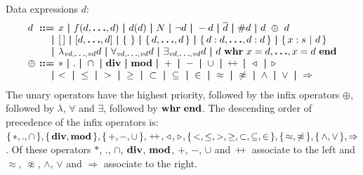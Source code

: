 \documentclass[a4paper,fleqn]{article}
\makeatletter
\newenvironment{tightarray}[1]
  {\setlength{\arraycolsep}{2pt}%
   \begin{array}{@{}#1@{}}%
  }
  {\end{array}%
  }
\newcommand{\f}[1]{\ensuremath{\mathit{#1}}}
\newcommand{\set}[1]{\ensuremath{\{\,#1\,\}}}
\newcommand{\scompr}[2]{\ensuremath{\set{#1\ |\ #2}}}
\newcommand{\el}{\ensuremath{[\,]}}
\newcommand{\cons}{\ensuremath{\hspace{0.12em}\triangleright\hspace{0.08em}}}
\newcommand{\snoc}{\ensuremath{\hspace{0.08em}\triangleleft\hspace{0.12em}}}
\newcommand{\concat}{\ensuremath{\hspace{0.12em}\raisebox{0.2ex}
{\text{\footnotesize+}\!\text{\footnotesize+}}\hspace{0.12em}}}
\newcommand{\limp}{\ensuremath{\Rightarrow}}
\newcommand{\mb}[1]{\text{\boldmath$#1$}}%
\newlength{\tlength}
\newcommand{\kwwhr}{{\bf whr}}
\newcommand{\kwend}{{\bf end}}
\newcommand{\kwdiv}{{\bf div}}
\newcommand{\kwmod}{{\bf mod}}
\makeatother
\begin{document}
Data expressions $d$:
\[\begin{tightarray}{lrl}
d      & \mb{::=} & x\ \mb{|}\ f(d, \mb{\ldots}, d)\ \mb{|}\ d(d)\ \mb{|}\ N\ \mb{|}\ 
               \lnot d\ \mb{|}\ -d\ \mb{|}\ \overline{d}\ \mb{|}\ \#d\ \mb{|}\ d\ \oplus\ d\\
       & \mb{|} & \el\ \mb{|}\ [d,\mb{\ldots},d]\ \mb{|}\ \set{}\ \mb{|}\ \set{d,\mb{\ldots},d}\ \mb{|}\ 
               \set{d: d,\mb{\ldots},d: d}\ \mb{|}\ \scompr{x: s}{d}\\
       & \mb{|} & \lambda_{\f{vd},\mb{\ldots},\f{vd}} d\ \mb{|}\ 
               \forall_{\f{vd},\mb{\ldots},\f{vd}} d\ \mb{|}\ 
               \exists_{\f{vd},\mb{\ldots},\f{vd}} d\ \mb{|}\ 
               d\ \kwwhr\ x=d,\mb{\ldots},x=d\ \kwend\\
\oplus & \mb{::=} & *\ \mb{|}\ .\ \mb{|}\ \cap\ \mb{|}\ 
               \kwdiv\ \mb{|}\ \kwmod\ \mb{|}\ 
               +\ \mb{|}\ -\ \mb{|}\ \cup\ \mb{|}\ 
               \concat\ \mb{|}\ 
               \snoc\ \mb{|}\ 
               \cons\\
       & \mb{|} &
               <\ \mb{|}\ \leq\ \mb{|}\ >\ \mb{|}\ \geq\ \mb{|}\ \subset\ \mb{|}\ \subseteq\ \mb{|}\ \in\ \mb{|}\ 
               \approx\ \mb{|}\ \not\approx\ \mb{|}\ 
               \land\ \mb{|}\ \lor\ \mb{|}\ 
               \limp\\
\end{tightarray}\]
The unary operators have the highest priority, followed by the infix operators
$\oplus$, followed by $\lambda$, $\forall$ and $\exists$, followed by
$\kwwhr\ \kwend$. The descending order of precedence of the infix operators is:
$\set{*, ., \cap}, \set{\kwdiv, \kwmod}, \set{+, -, \cup}, \concat, \snoc,
\cons, \set{<, \leq, >, \geq, \subset, \subseteq, \in}, \set{\approx,\not\approx},
\set{\land, \lor}, \limp$.
Of these operators $*$, $.$, $\cap$, $\kwdiv$, $\kwmod$, $+$, $-$, $\cup$ and $\concat$ associate to the left and 
$\approx$, $\not\approx$, $\land$, $\lor$ and $\limp$ associate to the right.
\end{document}

